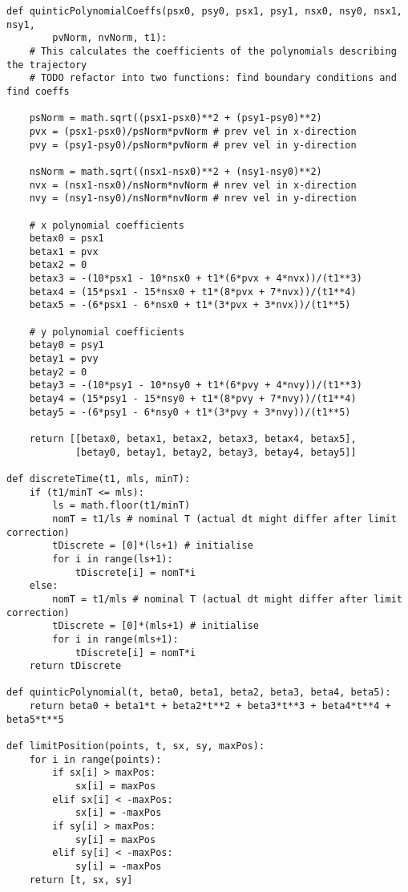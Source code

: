\begin{verbatim}
def quinticPolynomialCoeffs(psx0, psy0, psx1, psy1, nsx0, nsy0, nsx1, nsy1,
        pvNorm, nvNorm, t1):
    # This calculates the coefficients of the polynomials describing the trajectory
    # TODO refactor into two functions: find boundary conditions and find coeffs

    psNorm = math.sqrt((psx1-psx0)**2 + (psy1-psy0)**2) 
    pvx = (psx1-psx0)/psNorm*pvNorm # prev vel in x-direction
    pvy = (psy1-psy0)/psNorm*pvNorm # prev vel in y-direction

    nsNorm = math.sqrt((nsx1-nsx0)**2 + (nsy1-nsy0)**2)
    nvx = (nsx1-nsx0)/nsNorm*nvNorm # nrev vel in x-direction
    nvy = (nsy1-nsy0)/nsNorm*nvNorm # nrev vel in y-direction

    # x polynomial coefficients
    betax0 = psx1
    betax1 = pvx
    betax2 = 0
    betax3 = -(10*psx1 - 10*nsx0 + t1*(6*pvx + 4*nvx))/(t1**3)
    betax4 = (15*psx1 - 15*nsx0 + t1*(8*pvx + 7*nvx))/(t1**4)
    betax5 = -(6*psx1 - 6*nsx0 + t1*(3*pvx + 3*nvx))/(t1**5)

    # y polynomial coefficients
    betay0 = psy1
    betay1 = pvy
    betay2 = 0
    betay3 = -(10*psy1 - 10*nsy0 + t1*(6*pvy + 4*nvy))/(t1**3)
    betay4 = (15*psy1 - 15*nsy0 + t1*(8*pvy + 7*nvy))/(t1**4)
    betay5 = -(6*psy1 - 6*nsy0 + t1*(3*pvy + 3*nvy))/(t1**5)

    return [[betax0, betax1, betax2, betax3, betax4, betax5],
            [betay0, betay1, betay2, betay3, betay4, betay5]]

def discreteTime(t1, mls, minT):
    if (t1/minT <= mls):
        ls = math.floor(t1/minT)
        nomT = t1/ls # nominal T (actual dt might differ after limit correction)
        tDiscrete = [0]*(ls+1) # initialise
        for i in range(ls+1):
            tDiscrete[i] = nomT*i
    else:
        nomT = t1/mls # nominal T (actual dt might differ after limit correction)
        tDiscrete = [0]*(mls+1) # initialise
        for i in range(mls+1):
            tDiscrete[i] = nomT*i
    return tDiscrete

def quinticPolynomial(t, beta0, beta1, beta2, beta3, beta4, beta5):
    return beta0 + beta1*t + beta2*t**2 + beta3*t**3 + beta4*t**4 + beta5*t**5

def limitPosition(points, t, sx, sy, maxPos):
    for i in range(points):
        if sx[i] > maxPos:
            sx[i] = maxPos
        elif sx[i] < -maxPos:
            sx[i] = -maxPos
        if sy[i] > maxPos:
            sy[i] = maxPos
        elif sy[i] < -maxPos:
            sy[i] = -maxPos
    return [t, sx, sy]


\end{verbatim}
